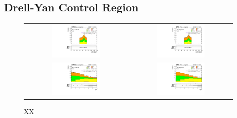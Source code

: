 \subsection{Drell-Yan Control Region}
\label{subsec:CR}

 \begin{figure}[tbh!]
 \begin{center}
 \begin{tabular}{cc}
 \includegraphics[width=0.48\textwidth]{figures/Part4/ObjEvt/llM_OnZ_ee}&
 \includegraphics[width=0.48\textwidth]{figures/Part4/ObjEvt/llM_OnZ_mumu}\\
  \includegraphics[width=0.48\textwidth]{figures/Part4/ObjEvt/njet_OnZ_ee}&
 \includegraphics[width=0.48\textwidth]{figures/Part4/ObjEvt/njet_OnZ_mumu}\\
 \end{tabular}
 \caption{XX}
 \label{fig:DY_CR}
 \end{center}
 \end{figure}


